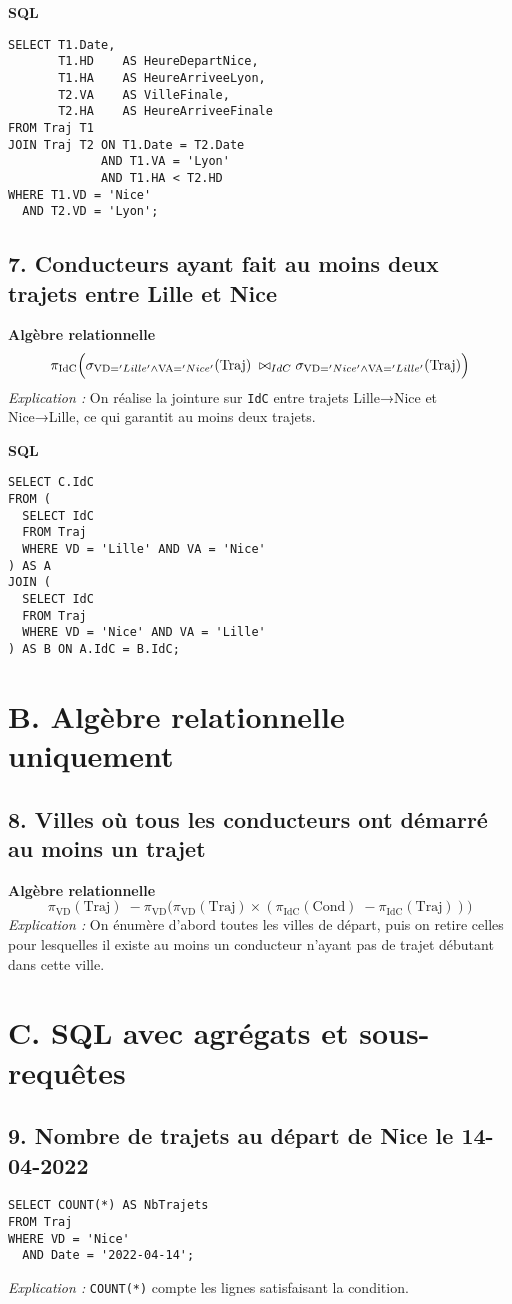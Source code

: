 \documentclass[a4paper,11pt]{article}
\begin{document}
\textbf{SQL}
\begin{verbatim}
SELECT T1.Date,
       T1.HD    AS HeureDepartNice,
       T1.HA    AS HeureArriveeLyon,
       T2.VA    AS VilleFinale,
       T2.HA    AS HeureArriveeFinale
FROM Traj T1
JOIN Traj T2 ON T1.Date = T2.Date
             AND T1.VA = 'Lyon'
             AND T1.HA < T2.HD
WHERE T1.VD = 'Nice'
  AND T2.VD = 'Lyon';
\end{verbatim}

\subsection*{7. Conducteurs ayant fait au moins deux trajets entre Lille et Nice}
\textbf{Algèbre relationnelle}\[
  \pi_{\text{IdC}}\Bigl(\sigma_{\text{VD}='Lille' \land \text{VA}='Nice'}(\text{Traj})
   \;
   \bowtie_{IdC}
   \sigma_{\text{VD}='Nice' \land \text{VA}='Lille'}(\text{Traj})\Bigr)
\]
\textit{Explication :} On réalise la jointure sur \texttt{IdC} entre trajets Lille→Nice et Nice→Lille, ce qui garantit au moins deux trajets.

\textbf{SQL}
\begin{verbatim}
SELECT C.IdC
FROM (
  SELECT IdC
  FROM Traj
  WHERE VD = 'Lille' AND VA = 'Nice'
) AS A
JOIN (
  SELECT IdC
  FROM Traj
  WHERE VD = 'Nice' AND VA = 'Lille'
) AS B ON A.IdC = B.IdC;
\end{verbatim}

\section*{B. Algèbre relationnelle uniquement}
\subsection*{8. Villes où tous les conducteurs ont démarré au moins un trajet}
\textbf{Algèbre relationnelle}\[
  \pi_{\text{VD}}(\text{Traj})
  \; -
  \pi_{\text{VD}}\bigl(\pi_{\text{VD}}(\text{Traj}) \times (\pi_{\text{IdC}}(\text{Cond})
    \; -
  \pi_{\text{IdC}}(\text{Traj}))\bigr)
\]
\textit{Explication :} On énumère d'abord toutes les villes de départ, puis on retire celles pour lesquelles il existe au moins un conducteur n'ayant pas de trajet débutant dans cette ville.

\section*{C. SQL avec agrégats et sous-requêtes}
\subsection*{9. Nombre de trajets au départ de Nice le 14-04-2022}
\begin{verbatim}
SELECT COUNT(*) AS NbTrajets
FROM Traj
WHERE VD = 'Nice'
  AND Date = '2022-04-14';
\end{verbatim}
\textit{Explication :} \texttt{COUNT(*)} compte les lignes satisfaisant la condition.
\end{document}
